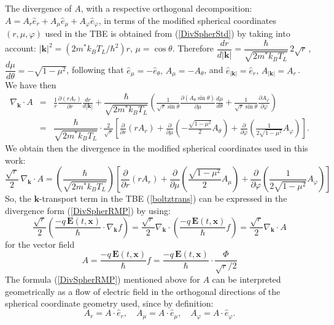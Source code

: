 \documentclass[11pt]{article}
\newcommand{\bk}{\mathbf{k}}
\newcommand{\bx}{\mathbf{x}}
\newcommand{\bE}{\mathbf{E}}
\newcommand{\kbt}{k_B T_L}
\begin{document}
The divergence of $A$, with a respective orthogonal decomposition: 
$A = A_{r} \hat{e}_{r} + A_{\mu} \hat{e}_{\mu} + A_{\varphi} \hat{e}_{\varphi} $,
in terms of the modified spherical coordinates $(r,\mu,\varphi)$ used in the TBE
is obtained from (\ref{DivSpherStd}) by taking into account:
$ { |\bk|^2}  = ( {2m^*\kbt}/\hbar^2 ) r $, $\mu = \cos \theta$.  
Therefore 
$\dfrac{dr}{d|\bk|} = \dfrac{ \hbar }{ \sqrt{2m^*\kbt} } \, 2\sqrt{r} \, $, 
$\dfrac{d \mu}{d \theta} = - \sqrt{1 - \mu^2} $,
following that $ \hat{e}_{\mu} = - \hat{e}_{\theta}, \, A_{\mu} = - A_{\theta} $, and $ \hat{e}_{|\bk|} = \hat{e}_{r}, \, A_{|\bk|} = A_{r} \, $.
We have then
%
\begin{eqnarray*} 
 \nabla_{\bk} \cdot A & = &  
 \frac{1}{r} \frac{\partial ( r A_{r} )}{\partial r} \frac{d r}{d |\bk|} +
 \dfrac{ \hbar }{ \sqrt{2m^*\kbt} }
\left(
 \frac{1}{\sqrt{r} \sin \theta} \frac{\partial ( A_{\theta} \sin \theta )}{\partial \mu} 
 \frac{d \mu}{d \theta} 
 + \frac{1}{\sqrt{r} \sin \theta } \frac{\partial A_{\varphi}}{\partial \varphi}
\right)
\\[7pt]
& = & 
 \dfrac{ \hbar }{ \sqrt{2m^*\kbt} } \cdot
 \frac{2}{\sqrt{r}}  \left[ 
 \frac{\partial }{\partial r} \left( r A_{r} \right) + 
 \frac{ \partial }{\partial \mu} \left( - \frac{ \sqrt{1 - \mu^2}}{2} A_{\theta} \right) 
 + \frac{\partial}{\partial \varphi} \left( \frac{1}{2 \sqrt{1 - \mu^2}} A_{\varphi} \right)
 \right] .
\end{eqnarray*}
%
We obtain then the divergence in the modified spherical coordinates used in this work: 
%
\begin{equation} \label{DivSpherRMP} 
 \frac{\sqrt{r}}{2} \,  \nabla_{\bk} \cdot A =  
\left( \dfrac{ \hbar }{ \sqrt{2m^*\kbt} } \right)
\left[
 \frac{\partial}{\partial r}  \left( r A_{r} \right) + 
 \frac{ \partial }{\partial \mu} \left(  \frac{ \sqrt{1 - \mu^2}}{2} A_{\mu} \right)
 + \frac{ \partial}{\partial \varphi} \left( \frac{1}{2 \sqrt{1 - \mu^2}} A_{\varphi} \right)
\right]
\end{equation}
%
So, the $\bk$-transport term in the TBE (\ref{boltztrans}) can be expressed 
in the divergence form (\ref{DivSpherRMP}) by using:
\begin{equation}
 \frac{\sqrt{r}}{2} \left( \frac{-q \, \bE(t,\bx)}{ \hbar} \cdot \nabla_{\bk} f \right) 
= \frac{\sqrt{r}}{2} \nabla_{\bk} \cdot \left( \frac{-q \, \bE(t,\bx)}{ \hbar} f \right)
= \frac{\sqrt{r}}{2} \nabla_{\bk} \cdot A
\end{equation} 
 for the vector field
\begin{equation} 
  A = \frac{-q \, \bE(t,\bx)}{ \hbar} f  = \frac{-q \, \bE(t,\bx)}{ \hbar} \cdot \frac{\Phi}{\sqrt{r}/2} 
\end{equation}
%
The formula (\ref{DivSpherRMP})  mentioned above for $A$ can be interpreted geometrically as a flow 
of electric field in the orthogonal directions of the spherical coordinate geometry used, since by 
definition: 
%
\begin{equation}
A_r = A \cdot \hat{e}_r , \quad A_{\mu} = A \cdot \hat{e}_{\mu}, \quad A_{\varphi} = A \cdot 
\hat{e}_{\varphi} .
\end{equation}
%
%
%
\end{document}

